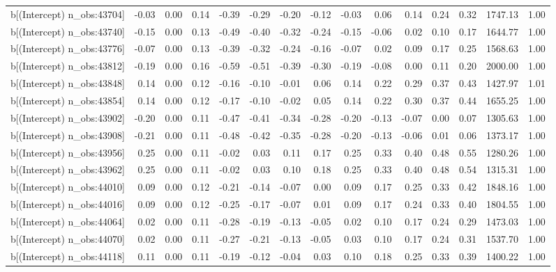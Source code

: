 \begin{table}[ht]
\begin{tabular}{rrrrrrrrrrrrrrr}
  b[(Intercept) n\_obs:43704] & -0.03 & 0.00 & 0.14 & -0.39 & -0.29 & -0.20 & -0.12 & -0.03 & 0.06 & 0.14 & 0.24 & 0.32 & 1747.13 & 1.00 \\ 
  b[(Intercept) n\_obs:43740] & -0.15 & 0.00 & 0.13 & -0.49 & -0.40 & -0.32 & -0.24 & -0.15 & -0.06 & 0.02 & 0.10 & 0.17 & 1644.77 & 1.00 \\ 
  b[(Intercept) n\_obs:43776] & -0.07 & 0.00 & 0.13 & -0.39 & -0.32 & -0.24 & -0.16 & -0.07 & 0.02 & 0.09 & 0.17 & 0.25 & 1568.63 & 1.00 \\ 
  b[(Intercept) n\_obs:43812] & -0.19 & 0.00 & 0.16 & -0.59 & -0.51 & -0.39 & -0.30 & -0.19 & -0.08 & 0.00 & 0.11 & 0.20 & 2000.00 & 1.00 \\ 
  b[(Intercept) n\_obs:43848] & 0.14 & 0.00 & 0.12 & -0.16 & -0.10 & -0.01 & 0.06 & 0.14 & 0.22 & 0.29 & 0.37 & 0.43 & 1427.97 & 1.01 \\ 
  b[(Intercept) n\_obs:43854] & 0.14 & 0.00 & 0.12 & -0.17 & -0.10 & -0.02 & 0.05 & 0.14 & 0.22 & 0.30 & 0.37 & 0.44 & 1655.25 & 1.00 \\ 
  b[(Intercept) n\_obs:43902] & -0.20 & 0.00 & 0.11 & -0.47 & -0.41 & -0.34 & -0.28 & -0.20 & -0.13 & -0.07 & 0.00 & 0.07 & 1305.63 & 1.00 \\ 
  b[(Intercept) n\_obs:43908] & -0.21 & 0.00 & 0.11 & -0.48 & -0.42 & -0.35 & -0.28 & -0.20 & -0.13 & -0.06 & 0.01 & 0.06 & 1373.17 & 1.00 \\ 
  b[(Intercept) n\_obs:43956] & 0.25 & 0.00 & 0.11 & -0.02 & 0.03 & 0.11 & 0.17 & 0.25 & 0.33 & 0.40 & 0.48 & 0.55 & 1280.26 & 1.00 \\ 
  b[(Intercept) n\_obs:43962] & 0.25 & 0.00 & 0.11 & -0.02 & 0.03 & 0.10 & 0.18 & 0.25 & 0.33 & 0.40 & 0.48 & 0.54 & 1315.31 & 1.00 \\ 
  b[(Intercept) n\_obs:44010] & 0.09 & 0.00 & 0.12 & -0.21 & -0.14 & -0.07 & 0.00 & 0.09 & 0.17 & 0.25 & 0.33 & 0.42 & 1848.16 & 1.00 \\ 
  b[(Intercept) n\_obs:44016] & 0.09 & 0.00 & 0.12 & -0.25 & -0.17 & -0.07 & 0.01 & 0.09 & 0.17 & 0.24 & 0.33 & 0.40 & 1804.55 & 1.00 \\ 
  b[(Intercept) n\_obs:44064] & 0.02 & 0.00 & 0.11 & -0.28 & -0.19 & -0.13 & -0.05 & 0.02 & 0.10 & 0.17 & 0.24 & 0.29 & 1473.03 & 1.00 \\ 
  b[(Intercept) n\_obs:44070] & 0.02 & 0.00 & 0.11 & -0.27 & -0.21 & -0.13 & -0.05 & 0.03 & 0.10 & 0.17 & 0.24 & 0.31 & 1537.70 & 1.00 \\ 
  b[(Intercept) n\_obs:44118] & 0.11 & 0.00 & 0.11 & -0.19 & -0.12 & -0.04 & 0.03 & 0.10 & 0.18 & 0.25 & 0.33 & 0.39 & 1400.22 & 1.00 \\ 

\end{tabular}
\end{table}
